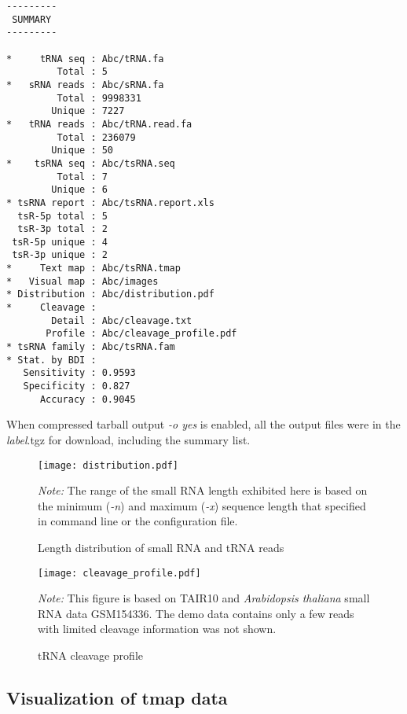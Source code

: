 \documentclass[11pt, a4paper]{article}
\begin{document}
{\footnotesize \begin{tcolorbox}[colback=blue!5!white,colframe=pink!75!black,title=tsRFinder demo output list]
\begin{verbatim}
---------
 SUMMARY
---------

*     tRNA seq : Abc/tRNA.fa
         Total : 5
*   sRNA reads : Abc/sRNA.fa
         Total : 9998331
        Unique : 7227
*   tRNA reads : Abc/tRNA.read.fa
         Total : 236079
        Unique : 50
*    tsRNA seq : Abc/tsRNA.seq
         Total : 7
        Unique : 6
* tsRNA report : Abc/tsRNA.report.xls
  tsR-5p total : 5
  tsR-3p total : 2
 tsR-5p unique : 4
 tsR-3p unique : 2
*     Text map : Abc/tsRNA.tmap
*   Visual map : Abc/images
* Distribution : Abc/distribution.pdf
*     Cleavage :
        Detail : Abc/cleavage.txt
       Profile : Abc/cleavage_profile.pdf
* tsRNA family : Abc/tsRNA.fam
* Stat. by BDI :
   Sensitivity : 0.9593
   Specificity : 0.827
      Accuracy : 0.9045
\end{verbatim}
\end{tcolorbox}}

When compressed tarball output \emph{-o yes} is enabled, all the output files were in the \emph{label}.tgz for download, including the summary list.

\begin{figure}[htbp]
\begin{center}
\texttt{[image: distribution.pdf]}
\caption{Length distribution of small RNA and tRNA reads}
\label{distribution}
\end{center}
\emph{Note:} The range of the small RNA length exhibited here is based on the minimum (\emph{-n}) and maximum (\emph{-x}) sequence length that specified in command line or the configuration file.
\end{figure}

\begin{figure}[htbp]
\begin{center}
\texttt{[image: cleavage\_profile.pdf]}
\caption{tRNA cleavage profile}
\label{cleavage}
\end{center}
\emph{Note:} This figure is based on TAIR10 and \textit{Arabidopsis thaliana} small RNA data GSM154336. The demo data contains only a few reads with limited cleavage information was not shown.
\end{figure}

\subsection{Visualization of tmap data}
\end{document}
